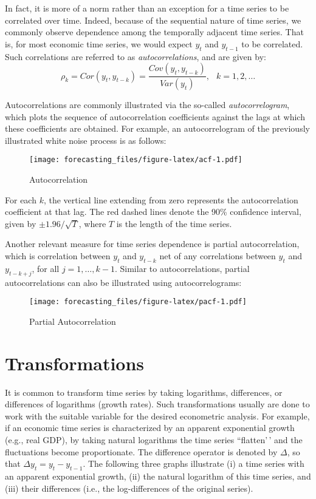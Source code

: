 \documentclass[
  oneside]{book}
\begin{document}
In fact, it is more of a norm rather than an exception for a time series to be correlated over time. Indeed, because of the sequential nature of time series, we commonly observe dependence among the temporally adjacent time series. That is, for most economic time series, we would expect \(y_t\) and \(y_{t-1}\) to be correlated. Such correlations are referred to as \emph{autocorrelations}, and are given by: \[\rho_k=Cor(y_t,y_{t-k}) = \frac{Cov(y_t,y_{t-k})}{Var(y_t)},\;~~k=1,2,\ldots\]

Autocorrelations are commonly illustrated via the so-called \emph{autocorrelogram}, which plots the sequence of autocorrelation coefficients against the lags at which these coefficients are obtained. For example, an autocorrelogram of the previously illustrated white noise process is as follows:

\begin{figure}
\centering
\texttt{[image: forecasting\_files/figure-latex/acf-1.pdf]}
\caption{\label{fig:acf}Autocorrelation}
\end{figure}

For each \(k\), the vertical line extending from zero represents the autocorrelation coefficient at that lag. The red dashed lines denote the 90\% confidence interval, given by \(\pm 1.96/\sqrt{T}\), where \(T\) is the length of the time series.

Another relevant measure for time series dependence is partial autocorrelation, which is correlation between \(y_t\) and \(y_{t-k}\) net of any correlations between \(y_t\) and \(y_{t-k+j}\), for all \(j=1,\ldots,k-1\). Similar to autocorrelations, partial autocorrelations can also be illustrated using autocorrelograms:

\begin{figure}
\centering
\texttt{[image: forecasting\_files/figure-latex/pacf-1.pdf]}
\caption{\label{fig:pacf}Partial Autocorrelation}
\end{figure}

\hypertarget{transformations}{%
\section{Transformations}\label{transformations}}

It is common to transform time series by taking logarithms, differences, or differences of logarithms (growth rates). Such transformations usually are done to work with the suitable variable for the desired econometric analysis. For example, if an economic time series is characterized by an apparent exponential growth (e.g., real GDP), by taking natural logarithms the time series ``flatten'\,' and the fluctuations become proportionate. The difference operator is denoted by \(\Delta\), so that \(\Delta y_t = y_t-y_{t-1}\). The following three graphs illustrate (i) a time series with an apparent exponential growth, (ii) the natural logarithm of this time series, and (iii) their differences (i.e., the log-differences of the original series).
\end{document}
